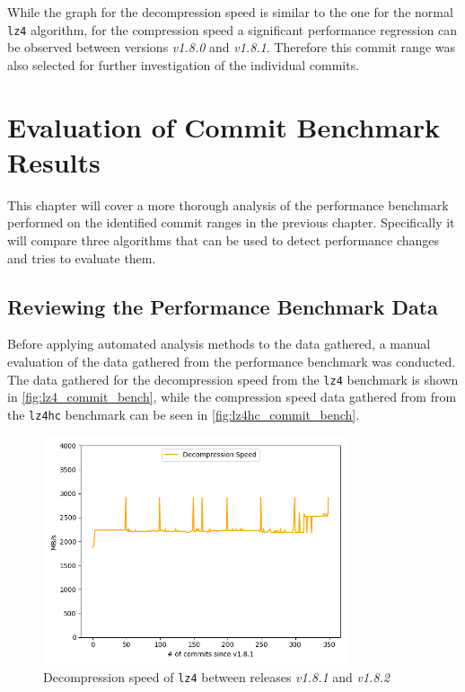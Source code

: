 \documentclass[	runningheads,
				a4paper]{llncs}
\begin{document}
	While the graph for the decompression speed is similar to the one for the normal \texttt{lz4} algorithm, for the compression speed a significant performance regression can be observed between versions \textit{v1.8.0} and \textit{v1.8.1}. Therefore this commit range was also selected for further investigation of the individual commits.

\section{Evaluation of Commit Benchmark Results}
\label{sec:exp_evaluation}
This chapter will cover a more thorough analysis of the performance benchmark performed on the identified commit ranges in the previous chapter. Specifically it will compare three algorithms that can be used to detect performance changes and tries to evaluate them. 


\subsection{Reviewing the Performance Benchmark Data}
Before applying automated analysis methods to the data gathered, a manual evaluation of the data gathered from the performance benchmark was conducted. The data gathered for the decompression speed from the \texttt{lz4} benchmark is shown in \autoref{fig:lz4_commit_bench}, while the compression speed data gathered from from the \texttt{lz4hc} benchmark can be seen in \autoref{fig:lz4hc_commit_bench}.

\begin{figure}[ht!]
	\centering
	\includegraphics[width=0.8\textwidth]{graph/lz4_commits_decompression}
	\caption{Decompression speed of \texttt{lz4} between releases \textit{v1.8.1} and \textit{v1.8.2}}
	\label{fig:lz4_commit_bench}
\end{figure}
\end{document}
